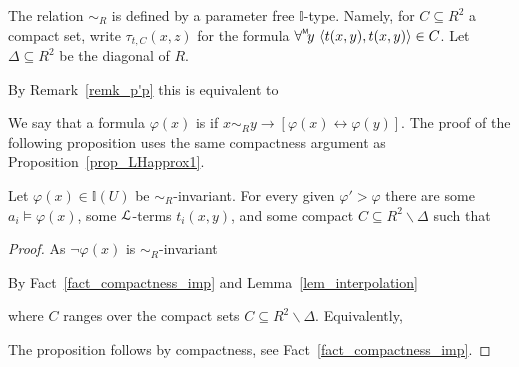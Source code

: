 \documentclass[11pt,oneside]{amsart}
\renewcommand*{\emph}[1]{%
   \smash{\tikz[baseline]\node[rectangle, fill=teal!25, rounded corners, inner xsep=0.5ex, inner ysep=0.2ex, anchor=base, minimum height = 2.7ex]{#1};}}
\begin{document}
The relation $\sim_R$ is defined by a parameter free $\mathds{I}$-type.
Namely, for $C\subseteq R^2$ a compact set, write $\tau_{t,C}(x,z)$ for the  formula $\forallM y\ \langle t(x,y),t(x,y)\rangle\in C$.
Let $\Delta\subseteq R^2$ be the diagonal of $R$.


By Remark~\ref{remk_p'p} this is equivalent to



We say that a formula $\varphi(x)$ is \emph{$\sim_{\!R}$-invariant\/} if $x\sim_{\!R} y\rightarrow[\varphi(x)\leftrightarrow\varphi(y)]$.
The proof of the following proposition uses the same compactness argument as Proposition~\ref{prop_LHapprox1}.

\begin{proposition}\label{prop_sim_approx}
  Let $\varphi(x)\in\mathds{I}(U)$ be $\sim_{\!R}$-invariant.
  For every given $\varphi'>\varphi$ there are some $a_i\models\varphi(x)$, some ${\EuScript L}$-terms $t_i(x,y)$, and some compact $C\subseteq R^2\smallsetminus\Delta$ such that 

\end{proposition}

\begin{proof}
  As $\neg\varphi(x)$ is $\sim_{\!R}$-invariant 


  By Fact~\ref{fact_compactness_imp} and Lemma~\ref{lem_interpolation}


  where $C$ ranges over the compact sets $C\subseteq R^2\smallsetminus\Delta$.
  Equivalently,


  The proposition follows by compactness, see Fact~\ref{fact_compactness_imp}.
\end{proof}
\end{document}
